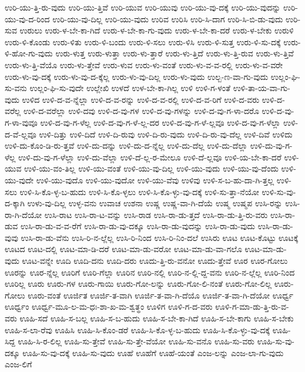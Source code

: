 {ಉರಿ-ಯು-ತ್ತಿ-ರು-ವುದು
ಉರಿ-ಯು-ತ್ತಿವೆ
ಉರಿ-ಯುವ
ಉರಿ-ಯುವು
ಉರಿ-ಯು-ವು-ದಕ್ಕೆ
ಉರಿ-ಯು-ವುದನ್ನು
ಉರಿ-ಯು-ವು-ದ-ರಿಂದ
ಉರಿ-ಯು-ವು-ದಿಲ್ಲ
ಉರಿ-ಯು-ವುದು
ಉರಿವ
ಉರಿಸಿ
ಉರಿ-ಸಿ-ದಾಗ
ಉರಿ-ಸಿ-ಬಿ-ಡು-ವುದು
ಉರಿ-ಸುವ
ಉರುಲು
ಉರು-ಳ-ಬೇ-ಕಾ-ಗಿದೆ
ಉರು-ಳ-ಬೇ-ಕಾ-ಗು-ವುದು
ಉರು-ಳ-ಬೇ-ಕಾ-ದರೆ
ಉರು-ಳ-ಬೇಕು
ಉರುಳಿ
ಉರು-ಳಿ-ಕೊಂಡು
ಉರು-ಳಿತು
ಉರು-ಳಿ-ಬಂದು
ಉರು-ಳಿ-ಸಲು
ಉರು-ಳಿಸಿ
ಉರು-ಳಿ-ಸುತ್ತ
ಉರು-ಳಿ-ಸು-ದಕ್ಕೆ
ಉರು-ಳಿ-ಹೋ-ಗು-ವುದು
ಉರು-ಳುತ್ತ
ಉರು-ಳುತ್ತಾ
ಉರು-ಳು-ತ್ತಾರೆ
ಉರು-ಳು-ತ್ತಿದೆ
ಉರು-ಳು-ತ್ತಿ-ರುವ
ಉರು-ಳು-ತ್ತಿವೆ
ಉರು-ಳು-ತ್ತಿ-ವೆಯೊ
ಉರು-ಳು-ತ್ತೇವೆ
ಉರು-ಳುವ
ಉರು-ಳು-ವಂತೆ
ಉರು-ಳು-ವ-ವ-ರಲ್ಲಿ
ಉರು-ಳು-ವ-ವರೇ
ಉರು-ಳು-ವು-ದಕ್ಕೆ
ಉರು-ಳು-ವು-ದ-ಕ್ಕೆಲ್ಲ
ಉರು-ಳು-ವು-ದಿಲ್ಲ
ಉರು-ಳು-ವುದು
ಉಲ್ಬ-ಣ-ವಾ-ಗು-ವುದು
ಉಲ್ಲಂ-ಘಿ-ಸು-ವನು
ಉಲ್ಲಂ-ಘಿ-ಸು-ವುದೇ
ಉಲ್ಲೇಖಿ
ಉಳದೆ
ಉಳ-ಬೇ-ಕಾ-ಗಿಲ್ಲ
ಉಳಿ
ಉಳಿ-ಗ-ಳಂತೆ
ಉಳಿ-ತಾ-ಯ-ವಾ-ಗು-ವುದು
ಉಳಿದ
ಉಳಿ-ದ-ವ-ನ್ನೆಲ್ಲಾ
ಉಳಿ-ದ-ವ-ರನ್ನು
ಉಳಿ-ದ-ವ-ರಲ್ಲಿ
ಉಳಿ-ದ-ವ-ರಿಗೆ
ಉಳಿ-ದ-ವರು
ಉಳಿ-ದ-ವರೆಲ್ಲ
ಉಳಿ-ದ-ವರೆಲ್ಲಾ
ಉಳಿ-ದವು
ಉಳಿ-ದ-ವು-ಗಳ
ಉಳಿ-ದ-ವು-ಗಳನ್ನು
ಉಳಿ-ದ-ವು-ಗ-ಳಾ-ದರೊ
ಉಳಿ-ದ-ವು-ಗ-ಳಾ-ವುವೂ
ಉಳಿ-ದ-ವು-ಗ-ಳೆಲ್ಲ
ಉಳಿ-ದ-ವು-ಗ-ಳೆ-ಲ್ಲ-ದರ
ಉಳಿ-ದ-ವು-ಗ-ಳೆ-ಲ್ಲವೂ
ಉಳಿ-ದ-ವು-ಗ-ಳೆಲ್ಲಾ
ಉಳಿ-ದ-ವೆ-ಲ್ಲವೂ
ಉಳಿ-ದಿತ್ತು
ಉಳಿ-ದಿದೆ
ಉಳಿ-ದಿ-ರುವು
ಉಳಿ-ದಿ-ರು-ವುದು
ಉಳಿ-ದಿ-ರು-ವು-ದೆಲ್ಲ
ಉಳಿ-ದಿವೆ
ಉಳಿದು
ಉಳಿ-ದು-ಕೊಂ-ಡಿ-ರು-ತ್ತವೆ
ಉಳಿ-ದು-ದನ್ನು
ಉಳಿ-ದು-ದ-ನ್ನೆಲ್ಲ
ಉಳಿ-ದು-ದೆಲ್ಲ
ಉಳಿ-ದು-ದೆಲ್ಲಾ
ಉಳಿ-ದು-ವು-ಗ-ಳೆಲ್ಲ
ಉಳಿ-ದು-ವು-ಗ-ಳೆಲ್ಲಾ
ಉಳಿ-ದು-ವೆಲ್ಲಾ
ಉಳಿ-ದೆ-ಲ್ಲ-ರ-ಮೇಲೂ
ಉಳಿ-ದೆ-ಲ್ಲವೂ
ಉಳಿ-ಯ-ಬೇ-ಕಾ-ದರೆ
ಉಳಿ-ಯುವ
ಉಳಿ-ಯು-ವಂ-ತಿಲ್ಲ
ಉಳಿ-ಯು-ವಂತೆ
ಉಳಿ-ಯು-ವು-ದಿಲ್ಲ
ಉಳಿ-ಯು-ವುದು
ಉಳಿ-ಯು-ವು-ದೆಂದು
ಉಳಿ-ಯು-ವುದೇ
ಉಳಿ-ಯು-ವುದೊ
ಉಳಿ-ಯು-ವುದೋ
ಉಳಿ-ಯು-ವೆವು
ಉಳಿವು
ಉಳಿ-ಸ-ಬ-ಹು-ದಾ-ಗಿ-ತ್ತಲ್ಲ
ಉಳಿ-ಸಲು
ಉಳಿ-ಸಿ-ಕೊ-ಳ್ಳ-ಬ-ಹುದು
ಉಳಿ-ಸಿ-ಕೊ-ಳ್ಳಲು
ಉಳಿ-ಸಿ-ಕೊ-ಳ್ಳು-ವು-ದಕ್ಕೆ
ಉಳಿ-ಸು-ತ್ತಾ-ನೆಯೋ
ಉಳಿ-ಸು-ವು-ದ-ಕ್ಕಾಗಿ
ಉಳು-ವು-ದಿಲ್ಲ
ಉಳ್ಳ-ವನು
ಉವಾಚ
ಉಶನಾ
ಉಷ್ಣ
ಉಷ್ಣ-ವಾ-ಗಿ-ದೆಯೆ
ಉಷ್ಮ
ಉಷ್ಮಪ
ಉಸಿ-ರನ್ನು
ಉಸಿ-ರಾ-ಗಿ-ದೆಯೋ
ಉಸಿ-ರಾಟ
ಉಸಿ-ರಾ-ಟ-ವನ್ನು
ಉಸಿ-ರಾಡ
ಉಸಿ-ರಾ-ಡು-ತ್ತದೆ
ಉಸಿ-ರಾ-ಡು-ತ್ತಿ-ರು-ವರು
ಉಸಿ-ರಾ-ಡುವ
ಉಸಿ-ರಾ-ಡು-ವ-ವ-ರೆಗೆ
ಉಸಿ-ರಾ-ಡು-ವು-ದಕ್ಕೂ
ಉಸಿ-ರಾ-ಡು-ವುದನ್ನು
ಉಸಿ-ರಾ-ಡು-ವುದು
ಉಸಿ-ರಾ-ಡು-ವುವು
ಉಸಿ-ರಾ-ಡು-ವೆನು
ಉಸಿ-ರಿ-ನ-ಲ್ಲೆಲ್ಲ
ಉಸಿ-ರಿ-ನಿಂದ
ಉಸಿ-ರಿ-ನಿಂ-ದಲೆ
ಉಸಿರು
ಊಟ
ಊಟ-ಕೊಟ್ಟು
ಊಟಕ್ಕೆ
ಊಟದ
ಊಟ-ದಲ್ಲಿ
ಊಟ-ಮಾ-ಡಿ-ದರೆ
ಊಟ-ಮಾ-ಡು-ವರೋ
ಊಟ-ಮಾ-ಡು-ವಾ-ಗಲೊ
ಊಟ-ಮಾ-ಡು-ವುದು
ಊಟ-ವನ್ನೇ
ಊದಿ
ಊದಿ-ದನು
ಊದಿ-ದರು
ಊದು-ತ್ತಿ-ರು-ವನೋ
ಊದು-ತ್ತೇವೆ
ಊರ
ಊರ-ಗೋಲು
ಊರನ್ನು
ಊರ-ನ್ನೆಲ್ಲ
ಊರಿಗೆ
ಊರಿ-ಗೆಲ್ಲಾ
ಊರಿನ
ಊರಿ-ನಲ್ಲಿ
ಊರಿ-ನ-ಲ್ಲಿ-ದ್ದ-ವನು
ಊರಿ-ನ-ಲ್ಲೆಲ್ಲ
ಊರಿ-ನಿಂದ
ಊರಿಲ್ಲ
ಊರು
ಊರು-ಗಳ
ಊರು-ಗಾಯಿ
ಊರು-ಗೋ-ಲನ್ನು
ಊರು-ಗೋ-ಲಿ-ನಂತೆ
ಊರು-ಗೋ-ಲಿಲ್ಲ
ಊರು-ಗೋಲು
ಊರು-ವಂತೆ
ಊರ್ಜಿತ
ಊರ್ಜಿ-ತ-ವಾಗಿ
ಊರ್ಜಿ-ತ-ವಾ-ಗಿ-ದೆಯೊ
ಊರ್ಜಿ-ತ-ವಾ-ಗಿ-ದೆಯೋ
ಊರ್ಧ್ವ
ಊರ್ಧ್ವಂ
ಊರ್ಧ್ವ-ಮೂ-ಲ-ಮ-ಧಃ-ಶಾ-ಖ-ಮ-ಶ್ವತ್ಥಂ
ಊಳಿಗ
ಊಳಿ-ಗ-ದ-ವರು
ಊಳಿ-ಗ-ಮಾ-ಡು-ತ್ತಿ-ರು-ವ-ವರು
ಊಹಿ-ಸದೆ
ಊಹಿ-ಸ-ಬಲ್ಲ
ಊಹಿ-ಸ-ಬ-ಹುದು
ಊಹಿ-ಸ-ಬೇ-ಕಾ-ಗಿದೆ
ಊಹಿ-ಸ-ಬೇ-ಕಾಗು
ಊಹಿ-ಸ-ಬೇಕು
ಊಹಿ-ಸ-ಲಾ-ರೆವು
ಊಹಿಸಿ
ಊಹಿ-ಸಿ-ಕೊಂ-ಡರೆ
ಊಹಿ-ಸಿ-ಕೊ-ಳ್ಳ-ಬ-ಹುದು
ಊಹಿ-ಸಿ-ಕೊ-ಳ್ಳು-ವು-ದಕ್ಕೆ
ಊಹಿ-ಸಿದ್ದ
ಊಹಿ-ಸಿ-ರ-ಲಿಲ್ಲ
ಊಹಿ-ಸು-ತ್ತೇವೆ
ಊಹಿ-ಸು-ತ್ತೇ-ವೆಯೋ
ಊಹಿ-ಸು-ವನೊ
ಊಹಿ-ಸು-ವರು
ಊಹಿ-ಸು-ವು-ದಕ್ಕೂ
ಊಹಿ-ಸು-ವು-ದಕ್ಕೆ
ಊಹಿ-ಸು-ವುದು
ಊಹೆ
ಊಹೆಗೆ
ಊಹೆ-ಯಂತೆ
ಎಂಜ-ಲನ್ನು
ಎಂಜ-ಲಾ-ಗು-ವುದು
ಎಂಜ-ಲಿಗೆ
}
